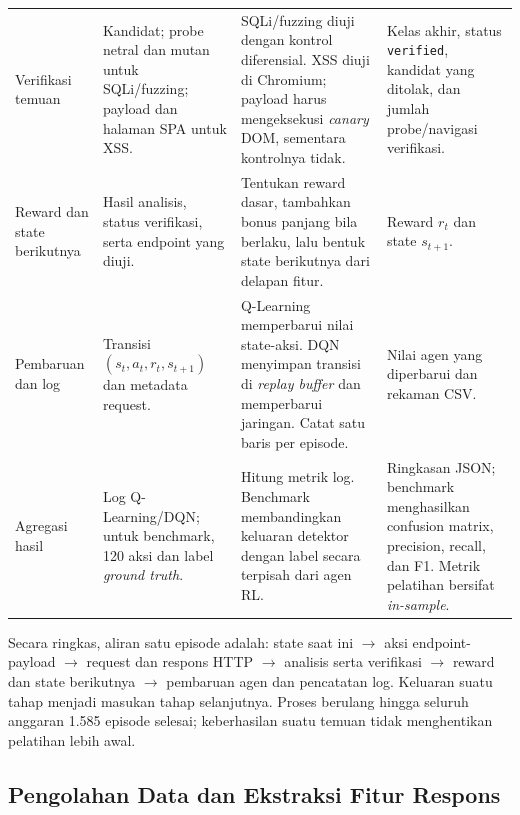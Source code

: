 \begin{table}[htbp]
\begin{tabularx}{\textwidth}{@{}
>{\raggedright\arraybackslash}p{1.7cm}
>{\raggedright\arraybackslash}p{2.8cm}
>{\raggedright\arraybackslash}X
>{\raggedright\arraybackslash}p{2.6cm}
@{}}
\addlinespace[2pt]
Verifikasi temuan & Kandidat; probe netral dan mutan untuk SQLi/fuzzing; payload dan halaman SPA untuk XSS. & SQLi/fuzzing diuji dengan kontrol diferensial. XSS diuji di Chromium; payload harus mengeksekusi \textit{canary} DOM, sementara kontrolnya tidak. & Kelas akhir, status \texttt{verified}, kandidat yang ditolak, dan jumlah probe/navigasi verifikasi. \\
\addlinespace[2pt]
Reward dan state berikutnya & Hasil analisis, status verifikasi, serta endpoint yang diuji. & Tentukan reward dasar, tambahkan bonus panjang bila berlaku, lalu bentuk state berikutnya dari delapan fitur. & Reward $r_t$ dan state $s_{t+1}$. \\
\addlinespace[2pt]
Pembaruan dan log & Transisi $(s_t,a_t,r_t,s_{t+1})$ dan metadata request. & Q-Learning memperbarui nilai state-aksi. DQN menyimpan transisi di \textit{replay buffer} dan memperbarui jaringan. Catat satu baris per episode. & Nilai agen yang diperbarui dan rekaman CSV. \\
\addlinespace[2pt]
Agregasi hasil & Log Q-Learning/DQN; untuk benchmark, 120 aksi dan label \textit{ground truth}. & Hitung metrik log. Benchmark membandingkan keluaran detektor dengan label secara terpisah dari agen RL. & Ringkasan JSON; benchmark menghasilkan confusion matrix, precision, recall, dan F1. Metrik pelatihan bersifat \textit{in-sample}. \\
\bottomrule
\end{tabularx}
\end{table}

Secara ringkas, aliran satu episode adalah: state saat ini $\rightarrow$ aksi endpoint-payload $\rightarrow$ request dan respons HTTP $\rightarrow$ analisis serta verifikasi $\rightarrow$ reward dan state berikutnya $\rightarrow$ pembaruan agen dan pencatatan log. Keluaran suatu tahap menjadi masukan tahap selanjutnya. Proses berulang hingga seluruh anggaran 1.585 episode selesai; keberhasilan suatu temuan tidak menghentikan pelatihan lebih awal.

\subsection{Pengolahan Data dan Ekstraksi Fitur Respons}

